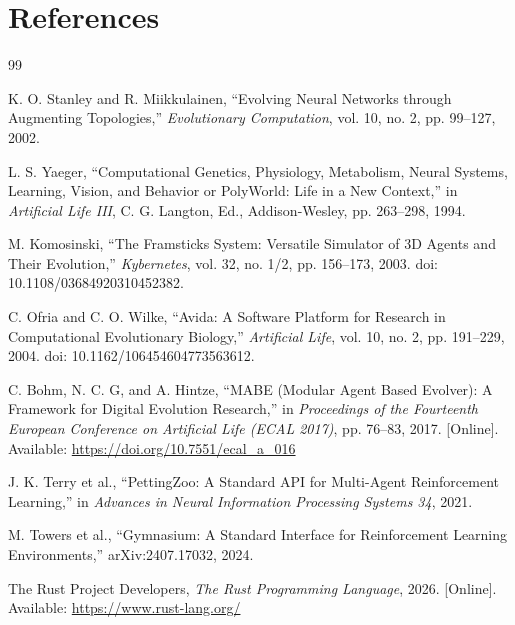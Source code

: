 
\clearpage
{}
\section*{References}
\renewcommand{\refname}{}
\singlespacing
\begin{thebibliography}{99}
\vspace{-\topsep}

K. O. Stanley and R. Miikkulainen,
``Evolving Neural Networks through Augmenting Topologies,''
\textit{Evolutionary Computation}, vol. 10, no. 2, pp. 99--127, 2002.

L. S. Yaeger,
``Computational Genetics, Physiology, Metabolism, Neural Systems, Learning,
Vision, and Behavior or PolyWorld: Life in a New Context,''
in \textit{Artificial Life III}, C. G. Langton, Ed., Addison-Wesley,
pp. 263--298, 1994.

M. Komosinski,
``The Framsticks System: Versatile Simulator of 3D Agents and Their Evolution,''
\textit{Kybernetes}, vol. 32, no. 1/2, pp. 156--173, 2003.
doi: 10.1108/03684920310452382.

C. Ofria and C. O. Wilke,
``Avida: A Software Platform for Research in Computational Evolutionary Biology,''
\textit{Artificial Life}, vol. 10, no. 2, pp. 191--229, 2004.
doi: 10.1162/106454604773563612.

C. Bohm, N. C. G, and A. Hintze,
``MABE (Modular Agent Based Evolver): A Framework for Digital Evolution Research,''
in \textit{Proceedings of the Fourteenth European Conference on Artificial Life (ECAL 2017)},
pp. 76--83, 2017.
[Online]. Available: \url{https://doi.org/10.7551/ecal_a_016}

J. K. Terry et al.,
``PettingZoo: A Standard API for Multi-Agent Reinforcement Learning,''
in \textit{Advances in Neural Information Processing Systems 34}, 2021.

M. Towers et al.,
``Gymnasium: A Standard Interface for Reinforcement Learning Environments,''
arXiv:2407.17032, 2024.

The Rust Project Developers,
\textit{The Rust Programming Language}, 2026.
[Online]. Available: \url{https://www.rust-lang.org/}


\end{thebibliography}
